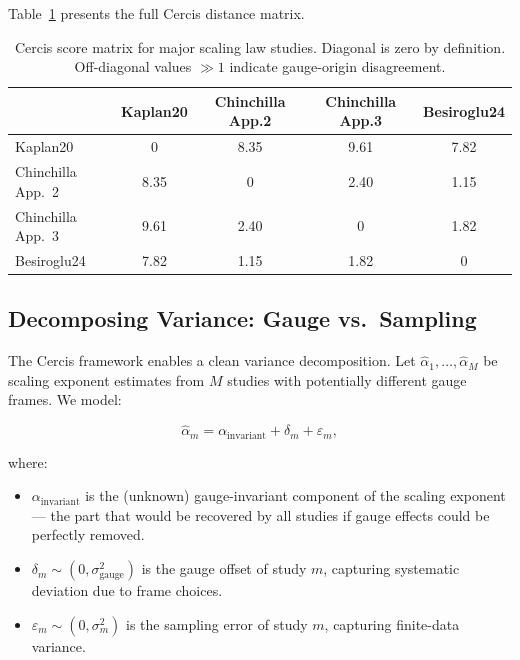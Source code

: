 \documentclass[12pt,a4paper]{article}
\theoremstyle{remark}
\begin{document}
Table~\ref{tab:cercis_matrix} presents the full Cercis distance matrix.

\begin{table}[H]
\centering
\caption{Cercis score matrix for major scaling law studies. Diagonal is zero by definition. Off-diagonal values $\gg 1$ indicate gauge-origin disagreement.}
\label{tab:cercis_matrix}
\begin{tabular}{@{}lcccc@{}}
\toprule
& \textbf{Kaplan20} & \textbf{Chinchilla App.2} & \textbf{Chinchilla App.3} & \textbf{Besiroglu24} \\
\midrule
Kaplan20            & 0    & 8.35 & 9.61 & 7.82 \\
Chinchilla App.~2   & 8.35 & 0    & 2.40 & 1.15 \\
Chinchilla App.~3   & 9.61 & 2.40 & 0    & 1.82 \\
Besiroglu24         & 7.82 & 1.15 & 1.82 & 0    \\
\bottomrule
\end{tabular}
\end{table}

\subsection{Decomposing Variance: Gauge vs.\ Sampling}

The Cercis framework enables a clean variance decomposition. Let $\hat{\alpha}_1, \dots, \hat{\alpha}_M$ be scaling exponent estimates from $M$ studies with potentially different gauge frames. We model:

\begin{equation}
\hat{\alpha}_m = \alpha_{\text{invariant}} + \delta_m + \varepsilon_m,
\label{eq:variance_decomp}
\end{equation}

where:
\begin{itemize}
    \item $\alpha_{\text{invariant}}$ is the (unknown) gauge-invariant component of the scaling exponent — the part that would be recovered by all studies if gauge effects could be perfectly removed.
    \item $\delta_m \sim (0, \sigma^2_{\text{gauge}})$ is the gauge offset of study $m$, capturing systematic deviation due to frame choices.
    \item $\varepsilon_m \sim (0, \sigma^2_m)$ is the sampling error of study $m$, capturing finite-data variance.
\end{itemize}
\end{document}
